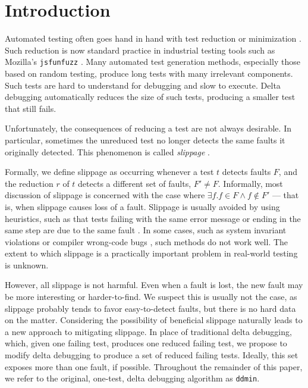 \section{Introduction}

Automated testing often goes hand in hand with
test reduction or minimization \cite{DD,MinUnit,TCminim,ICSEDiff,CReduce}.
Such reduction is
now standard practice in industrial testing tools such as Mozilla's
{\tt jsfunfuzz} \cite{jsfunfuzz2}.  Many automated
test generation methods, especially those based on random testing,
produce long tests with many irrelevant components.  Such tests are
hard to understand for debugging and slow to execute.  Delta debugging
automatically reduces the size of such tests,
producing a smaller test that still fails.

Unfortunately, the consequences of reducing a test are not always
desirable.  In particular, sometimes the unreduced test no longer
detects the same faults it originally detected.  This phenomenon is
called \emph{slippage} \cite{PLDI13}.  

Formally, we define slippage as occurring whenever a test $t$ detects
faults $F$, and the reduction $r$ of $t$ detects a different set of
faults, $F' \neq F$.  Informally, most discussion of slippage is
concerned with the case where
$\exists f .  f \in F \wedge f \not\in F'$ --- that is, when slippage
causes loss of a fault.  Slippage is usually avoided by using
heuristics, such as that tests failing with the same error message or
ending in the same step are due to the same fault \cite{ICSEDiff}.  In
some cases, such as system invariant violations or compiler wrong-code
bugs \cite{PLDI13}, such methods do not work well.  The extent to
which slippage is a practically important problem in real-world
testing is unknown.

However, all slippage is not
harmful.  Even when a fault is lost, the new fault may be more
interesting or harder-to-find.  We suspect this is usually not the
case, as slippage probably tends to favor easy-to-detect faults, but
there is no hard data on the matter.  Considering the
possibility of beneficial slippage naturally leads to a new approach to
mitigating slippage.  In place of traditional delta debugging, which,
given one failing test, produces one reduced failing test, we propose
to modify delta debugging to produce a set of reduced
failing tests.  Ideally, this set exposes more than one fault, if possible.
Throughout the remainder of this paper, we refer to the original,
one-test, delta debugging algorithm \cite{DD} as {\tt ddmin}.  

